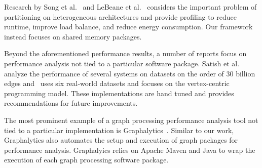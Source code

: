 \documentclass[conference]{IEEEtran}
\begin{document}
Research by Song et al.~\cite{Song:2016:LoadBalancing} and LeBeane et al.~\cite{LeBeane:2015:GraphHetero} considers the important problem of partitioning on heterogeneous architectures and provide profiling to reduce runtime, improve load balance, and reduce energy consumption.  Our framework instead focuses on shared memory packages. 

Beyond the aforementioned performance results, a number of reports focus on performance analysis not tied to a particular software package. Satish et al.~\mbox{\cite{Satish:2014:NavigatingGraph}} analyze the performance of several systems on datasets on the order of $30$ billion edges and~\cite{Lu:2014:ExperimentalEval} uses six real-world datasets and focuses on the vertex-centric programming model. These implementations are hand tuned and provides recommendations for future improvements.

The most prominent example of a graph processing performance analysis tool not tied to a particular implementation is Graphalytics~\cite{Capota:2015:Graphalytics}. Similar to our work, Graphalytics also automates the setup and execution of graph packages for performance analysis. Graphalyics relies on Apache Maven and Java to wrap the execution of each graph processing software package.
\end{document}
